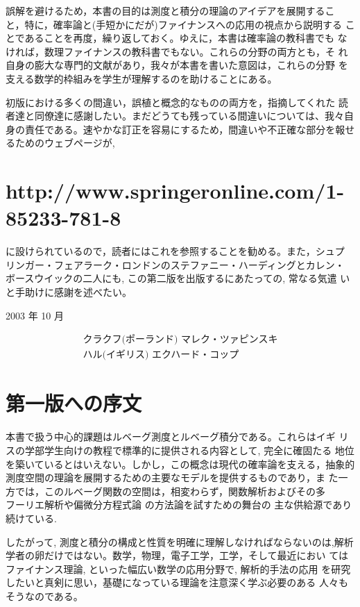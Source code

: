 \documentclass[14pt]{jsarticle}
\begin{document}
誤解を避けるため，本書の目的は測度と積分の理論のアイデアを展開するこ と，特に，確率論と(手短かにだが)ファイナンスへの応用の視点から説明する ことであることを再度，繰り返しておく。ゆえに，本書は確率論の教科書でも なければ，数理ファイナンスの教科書でもない。これらの分野の両方とも，そ れ自身の膨大な専門的文献があり，我々が本書を書いた意図は，これらの分野 を支える数学的枠組みを学生が理解するのを助けることにある。

初版における多くの間違い，誤植と概念的なものの両方を，指摘してくれた 読者達と同僚達に感謝したい。まだどうても残っている間違いについては、我々自身の責任である。速やかな訂正を容易にするため，間違いや不正確な部分を報せるためのウェブページが,

\section*{http://www.springeronline.com/1-85233-781-8}
に設けられているので，読者にはこれを参照することを勧める。また，シュプ リンガー・フェアラーク・ロンドンのステファニー・ハーディングとカレン・ ボースウイックの二人にも, この第二版を出版するにあたっての, 常なる気遣 いと手助けに感謝を述べたい。

2003 年 10 月

$$
\begin{array}{r}
\text { クラクフ(ポーランド) マレク・ツァピンスキ } \\
\text { ハル(イギリス) エクハード・コップ }
\end{array}
$$

\section*{第一版への序文}
本書で扱う中心的課題はルベーグ測度とルベーグ積分である。これらはイギ リスの学部学生向けの教程で標準的に提供される内容として, 完全に確固たる 地位を築いているとはいえない。しかし，この概念は現代の確率論を支える，抽象的測度空間の理論を展開するための主要なモデルを提供するものであり，ま た一方では，このルベーグ関数の空間は，相変わらず，関数解析およびその多 $\qquad$ フーリエ解析や偏微分方程式論 の方法論を試すための舞台の 主な供給源であり続けている.

したがって, 測度と積分の構成と性質を明確に理解しなければならないのは,解析学者の卵だけではない。数学，物理，電子工学，工学，そして最近におい てはファイナンス理論, といった幅広い数学の応用分野で, 解析的手法の応用 を研究したいと真剣に思い，基礎になっている理論を注意深く学ぶ必要のある 人々もそうなのである。
\end{document}
